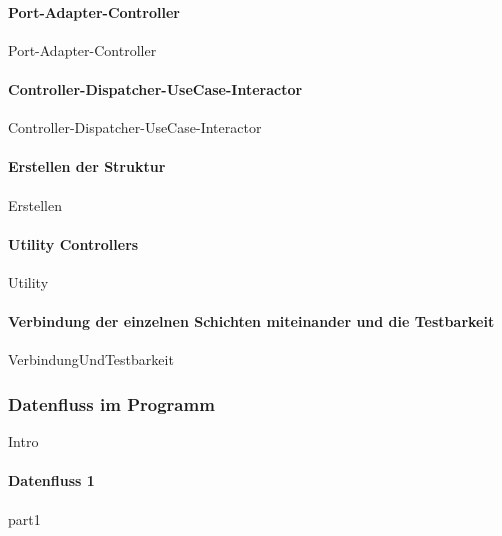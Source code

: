 \documentclass{article}
\begin{document}
            \paragraph{Port-Adapter-Controller}
            \label{Port-Adapter-Controller}
                {Port-Adapter-Controller}

            \paragraph{Controller-Dispatcher-UseCase-Interactor} 
            \label{Controller-Dispatcher-UseCase-Interactor}
                {Controller-Dispatcher-UseCase-Interactor}
    
            \newpage
            \paragraph{Erstellen der Struktur}
                {Erstellen}
   
            \paragraph{Utility Controllers}
            \label{kap:utilityControllers}
                {Utility}
   
            \paragraph{Verbindung der einzelnen Schichten miteinander und die Testbarkeit}
                {VerbindungUndTestbarkeit}

           
               
        \newpage
        \subsubsection{Datenfluss im Programm}
        \label{kap:Dataflow}
            {Intro}
           
            \newpage
            \paragraph{Datenfluss \textbf{1}}
            {part1}
            \newpage
\end{document}
